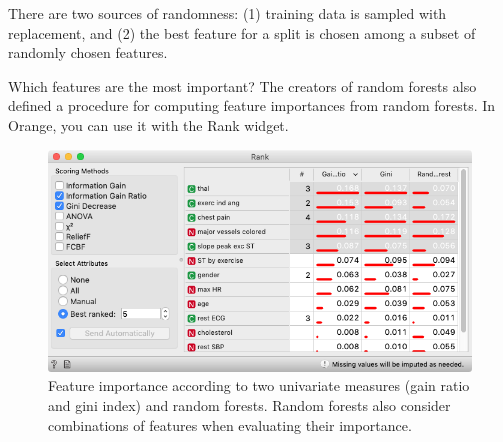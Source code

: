 There are two sources of randomness: (1) training data is sampled with replacement, and (2) the best feature for a split is chosen among a subset of randomly chosen features.

Which features are the most important? The creators of random forests also defined a procedure for computing feature importances from random forests. In Orange, you can use it with the Rank widget.

\begin{figure}[h]
    \centering
    \includegraphics[scale=0.35]{rank.png}
    \caption{Feature importance according to two univariate measures (gain ratio and gini index) and random forests. Random forests also consider combinations of features when evaluating their importance. }
\end{figure}
